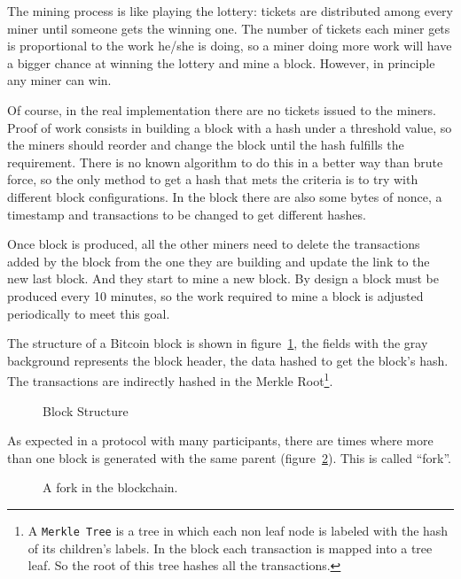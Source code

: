 The mining process is like playing the lottery: tickets are distributed  among
  every miner until someone gets the winning one. The number of tickets each
  miner gets is proportional to the work he/she is doing, so a miner doing more
  work will have a bigger chance at winning the lottery and mine a block.
However, in principle any miner can win.

Of course, in the real implementation there are no tickets issued to the
  miners.
Proof of work consists in building a block with a hash under a threshold value,
  so the miners should reorder and change the block until the hash fulfills the
  requirement.
There is no known algorithm to do this in a better way than brute force, so the
  only method to get a hash that mets the criteria is to try with different
  block configurations. In the block there are also some bytes of nonce, a
  timestamp and transactions to be changed to get different hashes.

Once block is produced, all the other miners need to delete the transactions
  added by the block from the one they are building and update the link to the
  new last block. And they start to mine a new block.
By design a block must be produced every 10 minutes, so the work required to
  mine a block is adjusted periodically to meet this goal.

The structure of a Bitcoin block is shown in figure~\ref{fig:block_pow}, the
  fields with the gray background represents the block header, the data hashed
  to get the block's hash.
The transactions are indirectly hashed in the Merkle Root\footnote{A
  \texttt{Merkle Tree} is a tree in which each non leaf node is labeled with
  the hash of its children's labels. In the block each transaction is mapped
  into a tree leaf. So the root of this tree hashes all the transactions.}.

  \begin{figure}[ht]
	\centering
	
	\caption{Block Structure}
	\label{fig:block_pow}
\end{figure}

As expected in a protocol with many participants, there are times where more
  than one block is generated with the same parent
  (figure~\ref{fig:chain_fork}). This is called ``fork''.

\begin{figure}
	\centering
	\def\svgwidth{0.7\columnwidth}
	
	\caption{A fork in the blockchain.}
	\label{fig:chain_fork}
\end{figure}

